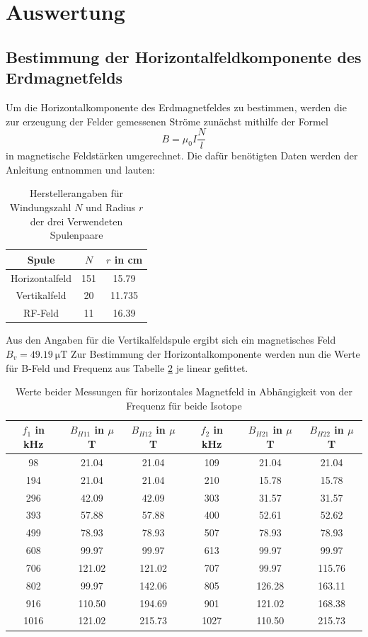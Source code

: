 \section{Auswertung}
\label{sec:Auswertung}
\subsection{Bestimmung der Horizontalfeldkomponente des Erdmagnetfelds}
\label{subsec:erdbfeld}
Um die Horizontalkomponente des Erdmagnetfeldes zu bestimmen, werden die zur erzeugung der Felder gemessenen Ströme zunächst mithilfe der Formel
\begin{equation}
  B = \mu_0 I \frac{N}{l}
  \label{eqn:Spulenbfeld}
\end{equation}
in magnetische Feldstärken umgerechnet.
Die dafür benötigten Daten werden der Anleitung\cite{Anleitung} entnommen und lauten:
\begin{table}[H]
  \centering
  \caption{Herstellerangaben für Windungszahl $N$ und Radius $r$ der drei Verwendeten Spulenpaare}
  \label{tab:Spulendaten}
  \begin{tabular}{c|c|c}
    Spule & $N$ &$r$ in cm\\
    \hline
    Horizontalfeld& 151 & 15.79\\
    Vertikalfeld  & 20  & 11.735\\
    RF-Feld       & 11  & 16.39\\
  \end{tabular}
\end{table}
Aus den Angaben für die Vertikalfeldspule ergibt sich ein magnetisches Feld $B_v = \SI{49.19}{\micro\tesla}$
Zur Bestimmung der Horizontalkomponente werden nun die Werte für B-Feld und Frequenz aus Tabelle \ref{tab:messung} je linear gefittet.
\begin{table}
  \centering
  \caption{Werte beider Messungen für horizontales Magnetfeld in Abhängigkeit von der Frequenz für beide Isotope}
  \label{tab:messung}
  \begin{tabular}{|c|c|c||c|c|c|}
    $f_1$ in kHz & $B_{H11}$ in $\mu$T &$B_{H12}$ in $\mu$T&$f_2$ in kHz & $B_{H21}$ in $\mu$T&$B_{H22}$ in $\mu$T\\
    \hline
     98& 21.04 & 21.04& 109& 21.04& 21.04 \\
     194& 21.04& 21.04& 210& 15.78& 15.78\\
     296& 42.09& 42.09& 303& 31.57& 31.57\\
     393& 57.88& 57.88& 400& 52.61& 52.62\\
     499& 78.93& 78.93& 507& 78.93& 78.93\\
     608& 99.97& 99.97& 613& 99.97& 99.97\\
     706& 121.02& 121.02& 707& 99.97& 115.76\\
     802& 99.97& 142.06& 805& 126.28& 163.11\\
     916& 110.50& 194.69& 901& 121.02& 168.38\\
     1016& 121.02& 215.73& 1027& 110.50& 215.73\\
  \end{tabular}
\end{table}
